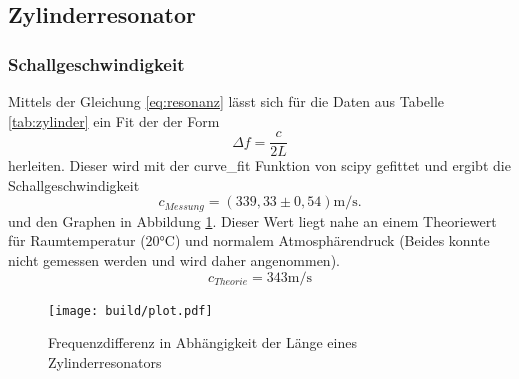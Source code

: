 \subsection{Zylinderresonator}
\subsubsection{Schallgeschwindigkeit}
Mittels der Gleichung \eqref{eq:resonanz} lässt sich für die Daten aus Tabelle \ref{tab:zylinder} ein Fit der der Form
\begin{equation}
  \Delta f = \frac{c}{2L}
\end{equation}
herleiten. Dieser wird mit der curve\_fit Funktion von scipy \cite{scipy} gefittet und ergibt die Schallgeschwindigkeit
\begin{equation}
  c_{Messung} =(339,33\pm 0,54)\si{\metre\per\second}.
\end{equation}
und den Graphen in Abbildung \ref{fig:plot_zylinder}.
Dieser Wert liegt nahe an einem Theoriewert \cite{schall} für Raumtemperatur ($20°$C) und normalem Atmosphärendruck (Beides konnte nicht gemessen werden und wird daher angenommen).
\begin{equation}
  c_{Theorie} =343\si{\metre\per\second}
\end{equation}


\begin{figure}
  \centering
  \texttt{[image: build/plot.pdf]}
  \caption{Frequenzdifferenz in Abhängigkeit der Länge eines Zylinderresonators}
  \label{fig:plot_zylinder}
\end{figure}

